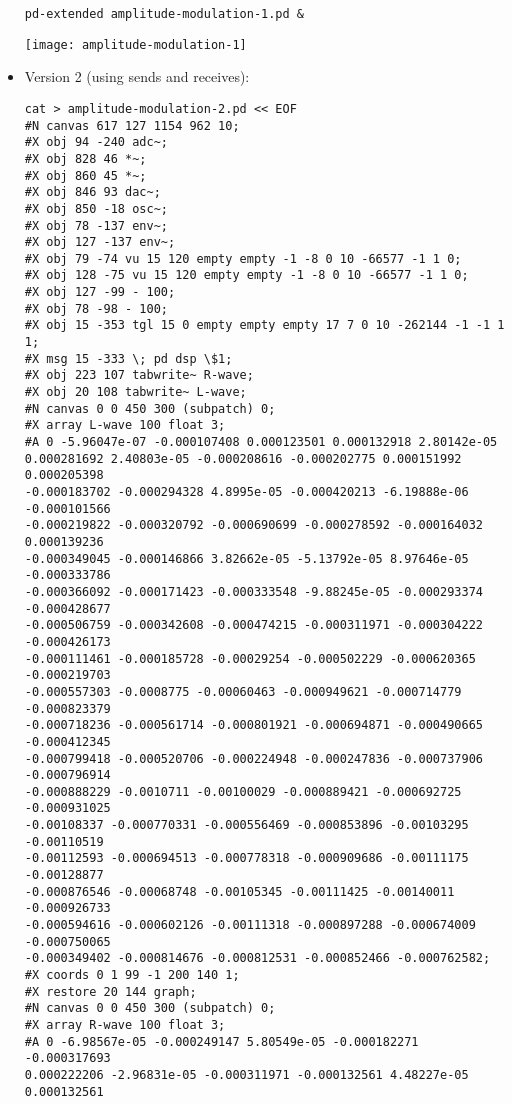 \begin{itemize}
\begin{verbatim}
pd-extended amplitude-modulation-1.pd &
\end{verbatim}

\begin{center}
  \texttt{[image: amplitude-modulation-1]}
\end{center}

\item Version 2 (using sends and receives):

\begin{verbatim}
cat > amplitude-modulation-2.pd << EOF
#N canvas 617 127 1154 962 10;
#X obj 94 -240 adc~;
#X obj 828 46 *~;
#X obj 860 45 *~;
#X obj 846 93 dac~;
#X obj 850 -18 osc~;
#X obj 78 -137 env~;
#X obj 127 -137 env~;
#X obj 79 -74 vu 15 120 empty empty -1 -8 0 10 -66577 -1 1 0;
#X obj 128 -75 vu 15 120 empty empty -1 -8 0 10 -66577 -1 1 0;
#X obj 127 -99 - 100;
#X obj 78 -98 - 100;
#X obj 15 -353 tgl 15 0 empty empty empty 17 7 0 10 -262144 -1 -1 1
1;
#X msg 15 -333 \; pd dsp \$1;
#X obj 223 107 tabwrite~ R-wave;
#X obj 20 108 tabwrite~ L-wave;
#N canvas 0 0 450 300 (subpatch) 0;
#X array L-wave 100 float 3;
#A 0 -5.96047e-07 -0.000107408 0.000123501 0.000132918 2.80142e-05
0.000281692 2.40803e-05 -0.000208616 -0.000202775 0.000151992 0.000205398
-0.000183702 -0.000294328 4.8995e-05 -0.000420213 -6.19888e-06 -0.000101566
-0.000219822 -0.000320792 -0.000690699 -0.000278592 -0.000164032 0.000139236
-0.000349045 -0.000146866 3.82662e-05 -5.13792e-05 8.97646e-05 -0.000333786
-0.000366092 -0.000171423 -0.000333548 -9.88245e-05 -0.000293374 -0.000428677
-0.000506759 -0.000342608 -0.000474215 -0.000311971 -0.000304222 -0.000426173
-0.000111461 -0.000185728 -0.00029254 -0.000502229 -0.000620365 -0.000219703
-0.000557303 -0.0008775 -0.00060463 -0.000949621 -0.000714779 -0.000823379
-0.000718236 -0.000561714 -0.000801921 -0.000694871 -0.000490665 -0.000412345
-0.000799418 -0.000520706 -0.000224948 -0.000247836 -0.000737906 -0.000796914
-0.000888229 -0.0010711 -0.00100029 -0.000889421 -0.000692725 -0.000931025
-0.00108337 -0.000770331 -0.000556469 -0.000853896 -0.00103295 -0.00110519
-0.00112593 -0.000694513 -0.000778318 -0.000909686 -0.00111175 -0.00128877
-0.000876546 -0.00068748 -0.00105345 -0.00111425 -0.00140011 -0.000926733
-0.000594616 -0.000602126 -0.00111318 -0.000897288 -0.000674009 -0.000750065
-0.000349402 -0.000814676 -0.000812531 -0.000852466 -0.000762582;
#X coords 0 1 99 -1 200 140 1;
#X restore 20 144 graph;
#N canvas 0 0 450 300 (subpatch) 0;
#X array R-wave 100 float 3;
#A 0 -6.98567e-05 -0.000249147 5.80549e-05 -0.000182271 -0.000317693
0.000222206 -2.96831e-05 -0.000311971 -0.000132561 4.48227e-05 0.000132561

\end{verbatim}
\end{itemize}
